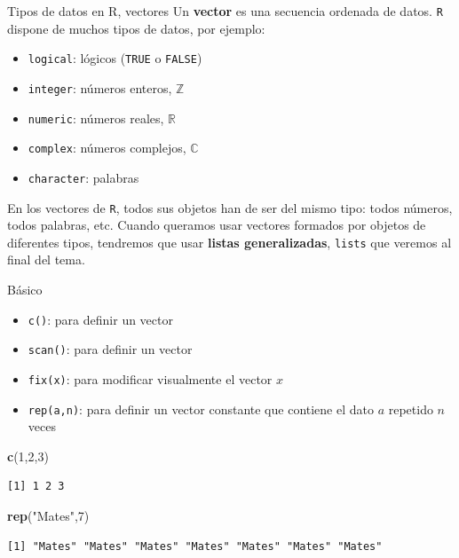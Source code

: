 \documentclass[
  ignorenonframetext,
  aspectratio=169]{beamer}
\newenvironment{Shaded}{\begin{snugshade}}{\end{snugshade}}
\newcommand{\DecValTok}[1]{\textcolor[rgb]{0.00,0.00,0.81}{#1}}
\newcommand{\FunctionTok}[1]{\textcolor[rgb]{0.13,0.29,0.53}{\textbf{#1}}}
\newcommand{\NormalTok}[1]{#1}
\newcommand{\StringTok}[1]{\textcolor[rgb]{0.31,0.60,0.02}{#1}}
\providecommand{\tightlist}{%
  \setlength{\itemsep}{0pt}\setlength{\parskip}{0pt}}
\begin{document}
\begin{frame}[fragile]{Tipos de datos en R, vectores}
\label{tipos-de-datos-en-r-vectores}
Un \textbf{vector} es una secuencia ordenada de datos. \texttt{R}
dispone de muchos tipos de datos, por ejemplo:

\begin{itemize}
\tightlist
\item
  \texttt{logical}: lógicos (\texttt{TRUE} o \texttt{FALSE})
\item
  \texttt{integer}: números enteros, \(\mathbb Z\)
\item
  \texttt{numeric}: números reales, \(\mathbb R\)
\item
  \texttt{complex}: números complejos, \(\mathbb C\)
\item
  \texttt{character}: palabras
\end{itemize}

En los vectores de \texttt{R}, todos sus objetos han de ser del mismo
tipo: todos números, todos palabras, etc. Cuando queramos usar vectores
formados por objetos de diferentes tipos, tendremos que usar
\textbf{listas generalizadas}, \texttt{lists} que veremos al final del
tema.
\end{frame}

\begin{frame}[fragile]{Básico}
\label{buxe1sico}
\begin{itemize}
\tightlist
\item
  \texttt{c()}: para definir un vector
\item
  \texttt{scan()}: para definir un vector
\item
  \texttt{fix(x)}: para modificar visualmente el vector \(x\)
\item
  \texttt{rep(a,n)}: para definir un vector constante que contiene el
  dato \(a\) repetido \(n\) veces
\end{itemize}

\begin{Shaded}
\begin{Highlighting}[]
\FunctionTok{c}\NormalTok{(}\DecValTok{1}\NormalTok{,}\DecValTok{2}\NormalTok{,}\DecValTok{3}\NormalTok{)}
\end{Highlighting}
\end{Shaded}

\begin{verbatim}
[1] 1 2 3
\end{verbatim}

\begin{Shaded}
\begin{Highlighting}[]
\FunctionTok{rep}\NormalTok{(}\StringTok{"Mates"}\NormalTok{,}\DecValTok{7}\NormalTok{)}
\end{Highlighting}
\end{Shaded}

\begin{verbatim}
[1] "Mates" "Mates" "Mates" "Mates" "Mates" "Mates" "Mates"
\end{verbatim}
\end{frame}
\end{document}
